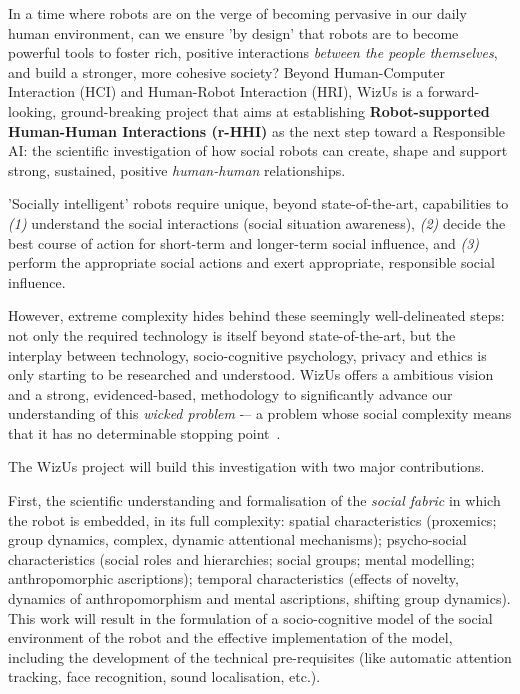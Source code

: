 \documentclass[]{article}
\newcommand{\project}{WizUs\xspace}
\begin{document}
In a time where robots are on the verge of becoming pervasive in our daily human
environment, can we ensure 'by design' that robots are to become powerful tools
to foster rich, positive interactions \emph{between the people themselves}, and
build a stronger, more cohesive society? Beyond Human-Computer Interaction (HCI)
and Human-Robot Interaction (HRI), \project is a forward-looking,
ground-breaking project that aims at establishing \textbf{Robot-supported
Human-Human Interactions (r-HHI)} as the next step toward a Responsible AI: the
scientific investigation of how social robots can create, shape and support
strong, sustained, positive \emph{human-human} relationships.

'Socially intelligent' robots require unique, beyond state-of-the-art,
capabilities to \emph{(1)} understand the social interactions (social
situation awareness), \emph{(2)} decide the best course of action for
short-term and longer-term social influence, and \emph{(3)} perform the
appropriate social actions and exert appropriate, responsible social influence.

However, extreme complexity hides behind these seemingly well-delineated steps:
not only the required technology is itself beyond state-of-the-art, but the
interplay between technology, socio-cognitive psychology, privacy and ethics is
only starting to be researched and understood. \project offers a ambitious
vision and a strong, evidenced-based, methodology to significantly advance our
understanding of this \emph{wicked problem} -– a problem whose social complexity
means that it has no determinable stopping point~\cite{tonkinwise2015design}.

The \project project will build this investigation with two major contributions.

First, the scientific understanding and formalisation of the \emph{social
fabric} in which the robot is embedded, in its full complexity: spatial
characteristics (proxemics; group dynamics, complex, dynamic attentional
mechanisms); psycho-social characteristics (social roles and hierarchies; social
groups; mental modelling; anthropomorphic ascriptions); temporal characteristics
(effects of novelty, dynamics of anthropomorphism and mental ascriptions,
shifting group dynamics). This work will result in the formulation of a
socio-cognitive model of the social environment of the robot and the effective
implementation of the model, including the development of the technical
pre-requisites (like automatic attention tracking, face recognition, sound
localisation, etc.).
\end{document}
